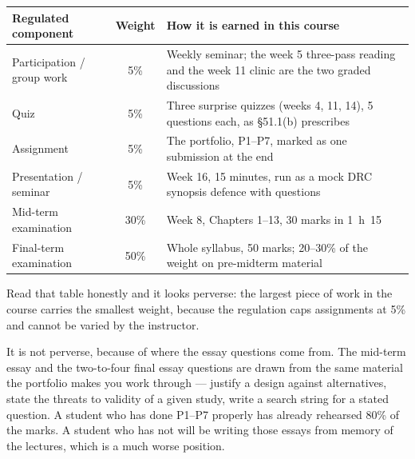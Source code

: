 \begin{center}
\small
\begin{tabular}{@{}L{4.8cm}cL{8.2cm}@{}}
\toprule
\textbf{Regulated component} & \textbf{Weight} & \textbf{How it is earned in this course} \\
\midrule
Participation / group work & 5\%  & Weekly seminar; the week 5 three-pass
                                    reading and the week 11 clinic are the
                                    two graded discussions \\
Quiz                       & 5\%  & Three surprise quizzes (weeks 4, 11, 14),
                                    5 questions each, as \S51.1(b) prescribes \\
Assignment                 & 5\%  & The portfolio, P1--P7, marked as one
                                    submission at the end \\
Presentation / seminar     & 5\%  & Week 16, 15 minutes, run as a mock DRC
                                    synopsis defence with questions \\
Mid-term examination       & 30\% & Week 8, Chapters 1--13, 30 marks in
                                    1~h~15 \\
Final-term examination     & 50\% & Whole syllabus, 50 marks; 20--30\% of the
                                    weight on pre-midterm material \\
\bottomrule
\end{tabular}
\end{center}

\begin{alertbox}
Read that table honestly and it looks perverse: the largest piece of work in
the course carries the smallest weight, because the regulation caps assignments
at 5\% and cannot be varied by the instructor.

\medskip
It is not perverse, because of where the essay questions come from. The
mid-term essay and the two-to-four final essay questions are drawn from the
same material the portfolio makes you work through --- justify a design
against alternatives, state the threats to validity of a given study, write a
search string for a stated question. A student who has done P1--P7 properly
has already rehearsed 80\% of the marks. A student who has not will be writing
those essays from memory of the lectures, which is a much worse position.
\end{alertbox}

